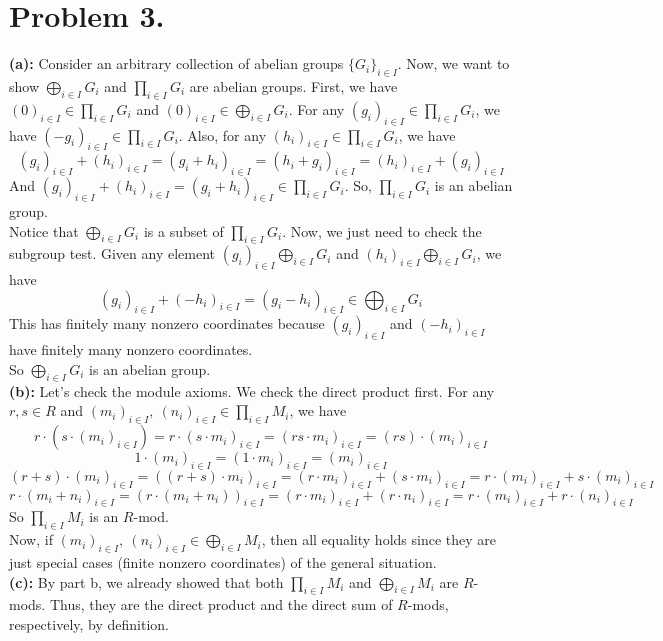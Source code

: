 \documentclass[12pt]{amsart}
\begin{document}
\section*{Problem 3.}
\noindent \textbf{(a):}  Consider an arbitrary collection of abelian groups $\{G_i\}_{i\in I}$. Now, we want to show $\bigoplus_{i\in I}G_i$ and $\prod_{i\in I} G_i$ are abelian groups. First, we have $(0)_{i\in I}\in \prod_{i\in I} G_i$ and $(0)_{i\in I}\in \bigoplus_{i\in I} G_i$. For any $(g_i)_{i\in I}\in \prod_{i\in I} G_i$, we have $(-g_i)_{i\in I}\in \prod_{i\in I} G_i$. Also, for any $(h_i)_{i\in I}\in \prod_{i\in I} G_i$, we have
\[(g_i)_{i\in I}+(h_i)_{i\in I}=(g_i+h_i)_{i\in I}=(h_i+g_i)_{i\in I}=(h_i)_{i\in I}+(g_i)_{i\in I}\]
And $(g_i)_{i\in I}+(h_i)_{i\in I}=(g_i+h_i)_{i\in I}\in \prod_{i\in I}G_i$. So, $ \prod_{i\in I}G_i$ is an abelian group. \\
Notice that $\bigoplus_{i\in I} G_i$ is a subset of $\prod_{i\in I}G_i$. Now, we just need to check the subgroup test. Given any element $(g_i)_{i\in I}\bigoplus_{i\in I}G_i$ and $(h_i)_{i\in I}\bigoplus_{i\in I}G_i$, we have
\[(g_i)_{i\in I}+(-h_i)_{i\in I}=(g_i-h_i)_{i\in I}\in \bigoplus_{i\in I}G_i\]
This has finitely many nonzero coordinates because $(g_i)_{i\in I}$ and $(-h_i)_{i\in I}$ have finitely many nonzero coordinates.\\
So $\bigoplus_{i\in I} G_i$ is an abelian group.\\
\textbf{(b):} Let's check the module axioms. We check the direct product first. For any $r,s\in R$ and $(m_i)_{i\in I},\ (n_i)_{i\in I}\in \prod_{i\in I}M_i$, we have
\[r\cdot (s\cdot (m_i)_{i\in I})=r\cdot (s\cdot m_i)_{i\in I}=(rs\cdot m_i)_{i\in I}=(rs)\cdot (m_i)_{i\in I}\]
\[1\cdot (m_i)_{i\in I}=(1\cdot m_i)_{i\in I}=(m_i)_{i\in I}\]
\[(r+s)\cdot(m_i)_{i\in I}=((r+s)\cdot m_i)_{i\in I}=(r\cdot m_i)_{i\in I}+(s\cdot m_i)_{i\in I}=r\cdot (m_i)_{i\in I}+s\cdot (m_i)_{i\in I}\]
\[r\cdot (m_i+n_i)_{i\in I}=(r\cdot (m_i+n_i))_{i\in I}=(r\cdot m_i)_{i\in I}+(r\cdot n_i)_{i\in I}=r\cdot (m_i)_{i\in I}+r\cdot (n_i)_{i\in I}\]
So $\prod_{i\in I}M_i$ is an $R$-mod.\\
Now, if $(m_i)_{i\in I},\ (n_i)_{i\in I}\in \bigoplus_{i\in I}M_i$, then all equality holds since they are just special cases (finite nonzero coordinates) of the general situation. \\
\textbf{(c):} By part b, we already showed that both $\prod_{i\in I}M_i$ and $\bigoplus_{i\in I}M_i$ are $R$-mods. Thus, they are the direct product and the direct sum of $R$-mods, respectively, by definition.\\
\end{document}

